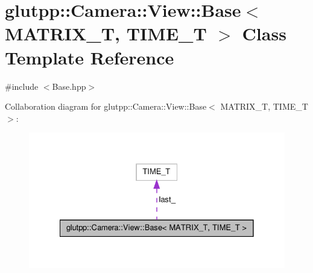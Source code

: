 \hypertarget{classglutpp_1_1Camera_1_1View_1_1Base}{\section{glutpp\-:\-:\-Camera\-:\-:\-View\-:\-:\-Base$<$ \-M\-A\-T\-R\-I\-X\-\_\-\-T, \-T\-I\-M\-E\-\_\-\-T $>$ \-Class \-Template \-Reference}
\label{classglutpp_1_1Camera_1_1View_1_1Base}
}


 




{\ttfamily \#include $<$\-Base.\-hpp$>$}



\-Collaboration diagram for glutpp\-:\-:\-Camera\-:\-:\-View\-:\-:\-Base$<$ \-M\-A\-T\-R\-I\-X\-\_\-\-T, \-T\-I\-M\-E\-\_\-\-T $>$\-:
\nopagebreak
\begin{figure}[H]
\begin{center}
\leavevmode
\includegraphics[width=328pt]{classglutpp_1_1Camera_1_1View_1_1Base__coll__graph}
\end{center}
\end{figure}
